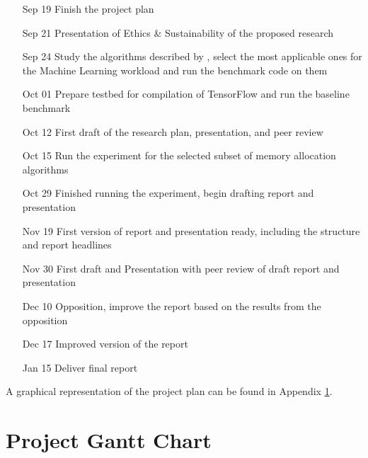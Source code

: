 \documentclass[12pt,twoside]{article}
\begin{document}

\begin{enumerate}[leftmargin=2cm]
    \item[Sep 19] Finish the project plan
    \item[Sep 21] Presentation of Ethics \& Sustainability of the proposed research
    \item[Sep 24] Study the algorithms described by \citeauthor{Vinkler2015} \cite{Vinkler2015}, select the most applicable ones for the Machine Learning workload and run the benchmark code on them
    \item[Oct 01] Prepare testbed for compilation of TensorFlow and run the baseline benchmark
    \item[Oct 12] First draft of the research plan, presentation, and peer review
    \item[Oct 15] Run the experiment for the selected subset of memory allocation algorithms
    \item[Oct 29] Finished running the experiment, begin drafting report and presentation
    \item[Nov 19] First version of report and presentation ready, including the structure and report headlines
    \item[Nov 30] First draft and Presentation with peer review of draft report and presentation
    \item[Dec 10] Opposition, improve the report based on the results from the opposition
    \item[Dec 17] Improved version of the report
    \item[Jan 15] Deliver final report 
\end{enumerate}

\noindent A graphical representation of the project plan can be found in Appendix \ref{sec:gantt}.




\appendix
\section{Project Gantt Chart}
\label{sec:gantt}
\end{document}
